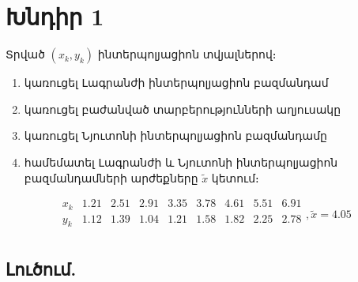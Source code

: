 \documentclass{article}
\begin{document}
\section*{Խնդիր 1}

Տրված $\left(x_{k}, y_{k}\right)$ ինտերպոլյացիոն տվյալներով։

\begin{enumerate}

\item	կառուցել Լագրանժի ինտերպոլյացիոն բազմանդամ
\item        կառուցել բաժանված տարբերությունների աղյուսակը
\item        կառուցել Նյուտոնի ինտերպոլյացիոն բազմանդամը
\item        համեմատել Լագրանժի և Նյուտոնի ինտերպոլյացիոն բազմանդամների արժեքները $\tilde{x}$ կետում։

\end{enumerate}

$$
\begin{array}{c|c|c|c|c|c|c|c|c}
		x_{k}	&	1.21		&	2.51		&	2.91		&	3.35		&	3.78		&	4.61		&	5.51		&	6.91  \\ \hline
 		y_{k}	&	1.12		&	1.39		&	1.04		&	1.21		&	1.58		&	1.82		&	2.25		&	2.78	 \\
\end{array},  \tilde{x} = 4.05
$$


\subsection*{Լուծում.}
\end{document}

